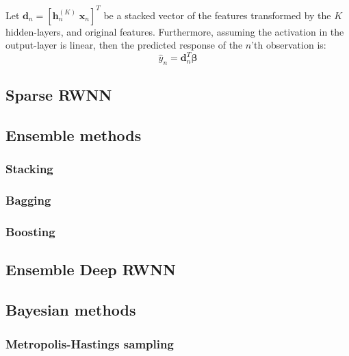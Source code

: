 \documentclass[
]{jss}
\begin{document}
Let \(\boldsymbol d_n = [\boldsymbol h^{(K)}_n \; \boldsymbol x_n]^T\)
be a stacked vector of the features transformed by the \(K\)
hidden-layers, and original features. Furthermore, assuming the
activation in the output-layer is linear, then the predicted response of
the \(n\)'th observation is: \begin{equation}
\hat{y}_n = \boldsymbol d^T_n \boldsymbol \beta
\end{equation}

\hypertarget{sparse-rwnn}{%
\subsection{Sparse RWNN}\label{sparse-rwnn}}

\hypertarget{ensemble-methods}{%
\subsection{Ensemble methods}\label{ensemble-methods}}

\hypertarget{stacking}{%
\subsubsection{Stacking}\label{stacking}}

\hypertarget{bagging}{%
\subsubsection{Bagging}\label{bagging}}

\hypertarget{boosting}{%
\subsubsection{Boosting}\label{boosting}}

\hypertarget{ensemble-deep-rwnn}{%
\subsection{Ensemble Deep RWNN}\label{ensemble-deep-rwnn}}

\hypertarget{bayesian-methods}{%
\subsection{Bayesian methods}\label{bayesian-methods}}

\hypertarget{metropolis-hastings-sampling}{%
\subsubsection{Metropolis-Hastings
sampling}\label{metropolis-hastings-sampling}}
\end{document}
